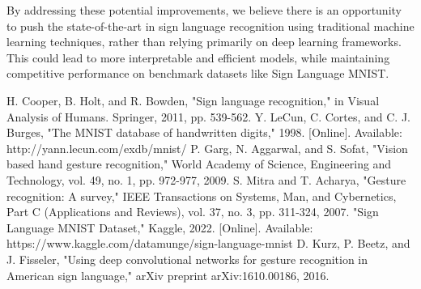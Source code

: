 \documentclass[times,final,english]{revdetua}
\begin{document}
By addressing these potential improvements, we believe there is an opportunity to push the state-of-the-art in sign language recognition using traditional machine learning techniques, rather than relying primarily on deep learning frameworks. This could lead to more interpretable and efficient models, while maintaining competitive performance on benchmark datasets like Sign Language MNIST.

\begin{thebibliography}{9}
 H. Cooper, B. Holt, and R. Bowden, "Sign language recognition," in Visual Analysis of Humans. Springer, 2011, pp. 539-562.
 Y. LeCun, C. Cortes, and C. J. Burges, "The MNIST database of handwritten digits," 1998. [Online]. Available: http://yann.lecun.com/exdb/mnist/
 P. Garg, N. Aggarwal, and S. Sofat, "Vision based hand gesture recognition," World Academy of Science, Engineering and Technology, vol. 49, no. 1, pp. 972-977, 2009.
 S. Mitra and T. Acharya, "Gesture recognition: A survey," IEEE Transactions on Systems, Man, and Cybernetics, Part C (Applications and Reviews), vol. 37, no. 3, pp. 311-324, 2007.
 "Sign Language MNIST Dataset," Kaggle, 2022. [Online]. Available: https://www.kaggle.com/datamunge/sign-language-mnist
 D. Kurz, P. Beetz, and J. Fisseler, "Using deep convolutional networks for gesture recognition in American sign language," arXiv preprint arXiv:1610.00186, 2016.
\end{thebibliography}
\end{document}
